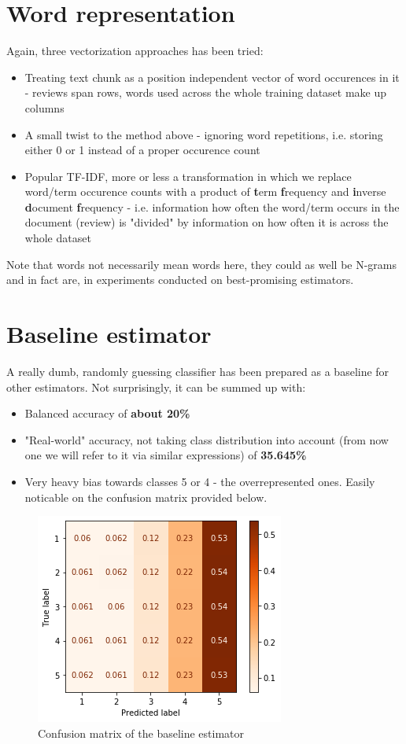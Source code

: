 \documentclass[letterpaper]{article}
\begin{document}
\section{Word representation}
Again, three vectorization approaches has been tried:

\begin{itemize}
    \item Treating text chunk as a position independent vector of word occurences in it - reviews span rows,
    words used across the whole training dataset make up columns
    \item A small twist to the method above - ignoring word repetitions, i.e. storing either 0 or 1
    instead of a proper occurence count
    \item Popular TF-IDF, more or less a transformation in which we replace word/term occurence counts
    with a product of \textbf{t}erm \textbf{f}requency and \textbf{i}nverse \textbf{d}ocument \textbf{f}requency -
    i.e. information how often the word/term occurs in the document (review) is "divided" by
    information on how often it is across the whole dataset
\end{itemize}
Note that words not necessarily mean words here, they could as well be N-grams and in fact are,
in experiments conducted on best-promising estimators.

\section{Baseline estimator}
A really dumb, randomly guessing classifier has been prepared as a baseline for other estimators.
Not surprisingly, it can be summed up with:

\begin{itemize}
    \item Balanced accuracy of \textbf{about 20\%}
    \item "Real-world" accuracy, not taking class distribution into account
    (from now one we will refer to it via similar expressions) of \textbf{35.645\%}
    \item Very heavy bias towards classes 5 or 4 - the overrepresented ones.
    Easily noticable on the confusion matrix provided below.
\end{itemize}

\begin{figure}
    \centering
    \includegraphics[scale=0.9]{baseline-confusion-matrix.png}
    \caption{Confusion matrix of the baseline estimator}
\end{figure}
\end{document}
